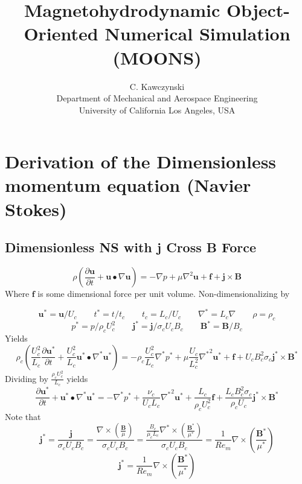 \documentclass[11pt]{article}
\begin{document}
\doublespacing
\title{Magnetohydrodynamic Object-Oriented Numerical Simulation (MOONS)}
\author{C. Kawczynski \\
Department of Mechanical and Aerospace Engineering \\
University of California Los Angeles, USA\\
}
\maketitle

\section{Derivation of the Dimensionless momentum equation (Navier Stokes)}
\subsection{Dimensionless NS with j Cross B Force}
\begin{equation}
	\rho \left( \frac{\partial \pmb{u}}{\partial t} + \pmb{u} \bullet \nabla \pmb{u} \right) = 
	-\nabla p + \mu \nabla^2 \pmb{u} + \pmb{f} + \pmb{j} \times \pmb{B}
\end{equation}
Where $\pmb{f}$ is some dimensional force per unit volume. Non-dimensionalizing by

\begin{equation}
	\pmb{u}^* = \pmb{u}/U_c \qquad
	t^* = t/t_c \qquad
	t_c = L_c/U_c \qquad
	\nabla^* = L_c \nabla \qquad
	\rho = \rho_c
\end{equation}
\begin{equation}
	p^* = p/\rho_c U_c^2 \qquad
	\pmb{j}^* = \pmb{j}/ \sigma_c U_c B_c \qquad
	\pmb{B}^* = \pmb{B}/B_c
\end{equation}
Yields
\begin{equation}
	\rho_c \left( \frac{U_c^2}{L_c} \frac{\partial \pmb{u^*}}{\partial t} + \frac{U_c^2}{L_c} \pmb{u^*} \bullet \nabla^* \pmb{u^*} \right) = 
	- \rho_c \frac{U_c^2}{L_c} \nabla^*  p^* + \mu \frac{U_c}{L_c^2} {\nabla^*}^2 \pmb{u^*} + \pmb{f} +
	U_c B_c^2 \sigma_c \pmb{j^*} \times \pmb{B^*}
\end{equation}
Dividing by $\frac{\rho_c U_c^2}{L_c}$ yields
\begin{equation}
	\frac{\partial \pmb{u^*}}{\partial t} + \pmb{u^*} \bullet \nabla^* \pmb{u^*} = 
	- \nabla^*  p^* + 
	\frac{\nu_c}{U_c L_c} {\nabla^*}^2 \pmb{u^*} + \frac{L_c}{\rho_c U_c^2} \pmb{f} + 
	\frac{L_c B_c^2 \sigma_c}{\rho_c U_c} \pmb{j^*} \times \pmb{B^*}
\end{equation}
Note that
\begin{equation}
	\pmb{j}^*
	=
	\frac{\pmb{j}}{\sigma_c U_c B_c}
	=
	\frac{\nabla \times \left( \frac{\pmb{B}}{\mu} \right)}{\sigma_c U_c B_c}
	=
	\frac{ \frac{B_c}{\mu_c L_c} \nabla^* \times \left( \frac{\pmb{B}^*}{\mu^*} \right)}{\sigma_c U_c B_c}
	=
	\frac{1}{Re_m} \nabla \times \left( \frac{\pmb{B}^*}{\mu^*} \right)
\end{equation}
\begin{equation}
	\boxed{
	\pmb{j}^*
	=
	\frac{1}{Re_m} \nabla \times \left( \frac{\pmb{B}^*}{\mu^*} \right)
	}
\end{equation}
\end{document}
